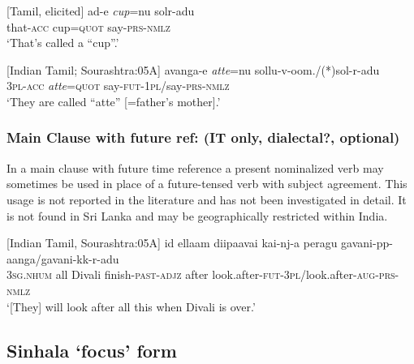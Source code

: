 \ea\label{smith:ex:18}
{}[Tamil, elicited]
\gll ad-e {\em cup}=nu solr-adu\\
that-\textsc{acc} cup=\textsc{quot} say-\textsc{prs}-\textsc{nmlz} \\
`That's called a ``cup''.'
\z

\ea\label{smith:ex:19}
{}[Indian Tamil; Sourashtra:05A]
\gll avanga{\textrtaill}-e {\em atte}=nu sollu-v-oom./(*)sol-r-adu\\
3\textsc{pl}-\textsc{acc} {\em atte}=\textsc{quot} say-\textsc{fut}-1\textsc{pl}/say-\textsc{prs}-\textsc{nmlz} \\
`They are called ``atte'' [=father's mother].'
\z

\subsubsection{Main Clause with future ref: (IT only, dialectal?, optional)}%

In a main clause with future time reference a present nominalized verb may sometimes be used in place of a future-tensed verb with subject agreement. This usage is not reported in the literature and has not been investigated in detail. It is not found in Sri Lanka and may be geographically restricted within India. 

\ea\label{smith:ex:20}
{}[Indian Tamil, Sourashtra:05A]
\gll id ellaam diipaava{\textrtaill}i ka{\textrtaill}i-nj-a peragu gavani-pp-aanga/gavani-kk-r-adu\\
3\textsc{sg}.\textsc{nhum} all Divali finish-\textsc{past}-\textsc{adjz} after look.after-\textsc{fut}-3\textsc{pl}/look.after-\textsc{aug}-\textsc{prs}-\textsc{nmlz} \\
`[They] will look after all this when Divali is over.'
\z


\subsection{Sinhala `focus' form}


